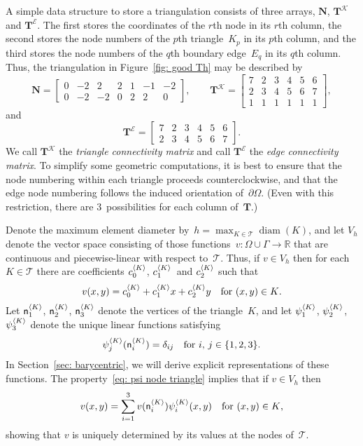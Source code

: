 A simple data structure to store a triangulation consists of three arrays,
$\boldsymbol{N}$, $\boldsymbol{T}^{\mathcal{K}}$ and
$\boldsymbol{T}^{\mathcal{E}}$.  The first stores the coordinates of the
$r$th node in its $r$th column, the second stores the node numbers of the
$p$th triangle~$K_p$ in its $p$th column, and the third stores the node numbers
of the $q$th boundary edge~$E_q$ in its $q$th column.  Thus, the triangulation
in Figure~\ref{fig: good Th} may be described by
\[
\boldsymbol{N}=\begin{bmatrix}
 0&-2& 2& 2& 1&-1&-2\\
 0&-2&-2& 0& 2& 2& 0
\end{bmatrix},\qquad
\boldsymbol{T}^{\mathcal{K}}=\begin{bmatrix}
7&2&3&4&5&6\\
2&3&4&5&6&7\\
1&1&1&1&1&1
\end{bmatrix},
\]
and
\[
\boldsymbol{T}^{\mathcal{E}}=\begin{bmatrix}
7&2&3&4&5&6\\
2&3&4&5&6&7 \end{bmatrix}.
\]
We call $\boldsymbol{T}^{\mathcal{K}}$ the \emph{triangle connectivity matrix}
and call $\boldsymbol{T}^{\mathcal{E}}$ the \emph{edge connectivity matrix}.
To simplify some geometric computations, it is best to ensure that the node
numbering within each triangle proceeds counterclockwise, and that the edge
node numbering follows the induced orientation of~$\partial\Omega$. (Even with 
this restriction, there are $3$~possibilities for each column 
of~$\boldsymbol{T}$.)

Denote the maximum element diameter 
by~$h=\max_{K\in\mathcal{T}}\operatorname{diam}(K)$, and let $V_h$ denote the 
vector space consisting of those functions~$v:\Omega\cup\Gamma\to\mathbb{R}$ 
that are continuous and piecewise-linear with respect to~$\mathcal{T}$.  Thus,
if $v\in V_h$ then for each~$K\in\mathcal{T}$ there are coefficients 
$c^{\langle K\rangle}_0$, $c^{\langle K\rangle}_1$~and $c^{\langle K\rangle}_2$ such that
\begin{equation}\label{eq: v K 1 x y}
v(x,y)=c^{\langle K\rangle}_0+c^{\langle K\rangle}_1x+c^{\langle K\rangle}_2y
	\quad\text{for $(x,y)\in K$.}
\end{equation}
Let $\mathsf{n}^{\langle K\rangle}_1$, $\mathsf{n}^{\langle K\rangle}_2$, $\mathsf{n}^{\langle K\rangle}_3$ 
denote the vertices of the triangle~$K$, and let $\psi^{\langle K\rangle}_1$, 
$\psi^{\langle K\rangle}_2$, $\psi^{\langle K\rangle}_3$ denote the unique linear functions 
satisfying
\begin{equation}\label{eq: psi node triangle}
\psi^{\langle K\rangle}_j(\mathsf{n}^{\langle K\rangle}_i)=\delta_{ij}
	\quad\text{for $i$, $j\in\{1,2,3\}$.}
\end{equation}
In Section~\ref{sec: barycentric}, we will derive explicit representations of 
these functions.  The property~\eqref{eq: psi node triangle} implies that if 
$v\in V_h$ then
\[
v(x,y)=\sum_{i=1}^3v(\mathsf{n}^{\langle K\rangle}_i)\psi^{\langle K\rangle}_i(x,y)
	\quad\text{for $(x,y)\in K$,}
\]
showing that $v$ is uniquely determined by its values at the nodes 
of~$\mathcal{T}$.

